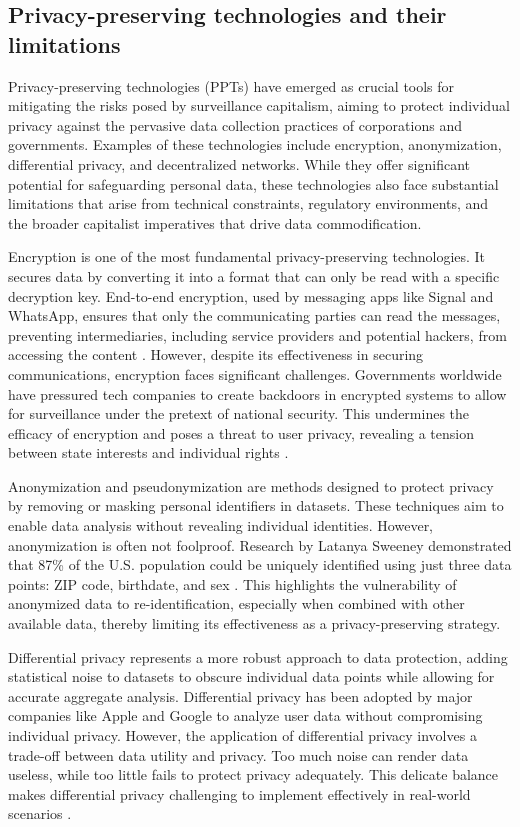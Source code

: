 \subsection{Privacy-preserving technologies and their limitations}

Privacy-preserving technologies (PPTs) have emerged as crucial tools for mitigating the risks posed by surveillance capitalism, aiming to protect individual privacy against the pervasive data collection practices of corporations and governments. Examples of these technologies include encryption, anonymization, differential privacy, and decentralized networks. While they offer significant potential for safeguarding personal data, these technologies also face substantial limitations that arise from technical constraints, regulatory environments, and the broader capitalist imperatives that drive data commodification.

Encryption is one of the most fundamental privacy-preserving technologies. It secures data by converting it into a format that can only be read with a specific decryption key. End-to-end encryption, used by messaging apps like Signal and WhatsApp, ensures that only the communicating parties can read the messages, preventing intermediaries, including service providers and potential hackers, from accessing the content \cite[pp.~89-91]{buchanan2020hacker}. However, despite its effectiveness in securing communications, encryption faces significant challenges. Governments worldwide have pressured tech companies to create backdoors in encrypted systems to allow for surveillance under the pretext of national security. This undermines the efficacy of encryption and poses a threat to user privacy, revealing a tension between state interests and individual rights \cite[pp.~110-113]{buchanan2020hacker}.

Anonymization and pseudonymization are methods designed to protect privacy by removing or masking personal identifiers in datasets. These techniques aim to enable data analysis without revealing individual identities. However, anonymization is often not foolproof. Research by Latanya Sweeney demonstrated that 87\% of the U.S. population could be uniquely identified using just three data points: ZIP code, birthdate, and sex \cite[pp.~1-3]{sweeney2000simple}. This highlights the vulnerability of anonymized data to re-identification, especially when combined with other available data, thereby limiting its effectiveness as a privacy-preserving strategy.

Differential privacy represents a more robust approach to data protection, adding statistical noise to datasets to obscure individual data points while allowing for accurate aggregate analysis. Differential privacy has been adopted by major companies like Apple and Google to analyze user data without compromising individual privacy. However, the application of differential privacy involves a trade-off between data utility and privacy. Too much noise can render data useless, while too little fails to protect privacy adequately. This delicate balance makes differential privacy challenging to implement effectively in real-world scenarios \cite[pp.~35-38]{dwork2014algorithmic}.

